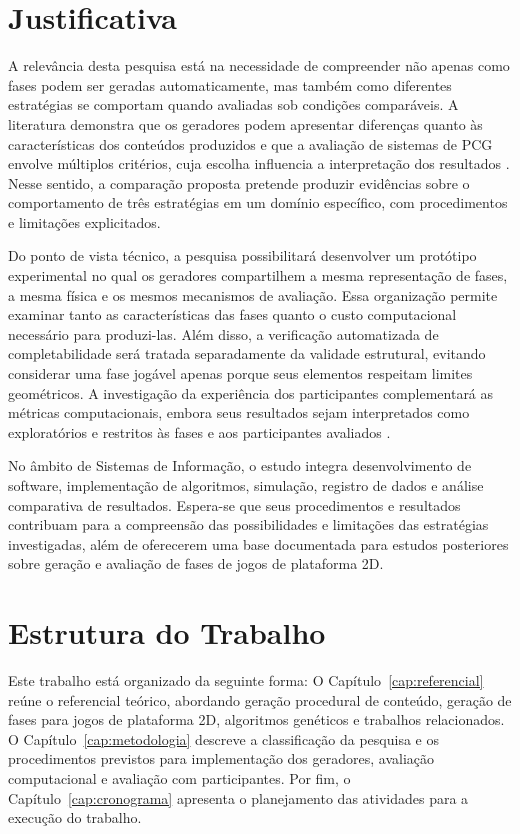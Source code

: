 \section{Justificativa}

A relevância desta pesquisa está na necessidade de compreender não apenas como 
fases podem ser geradas automaticamente, mas também como diferentes estratégias 
se comportam quando avaliadas sob condições comparáveis. A literatura demonstra 
que os geradores podem apresentar diferenças quanto às características dos 
conteúdos produzidos e que a avaliação de sistemas de PCG envolve múltiplos 
critérios, cuja escolha influencia a interpretação dos resultados 
\cite{SchaaBarriga2024,Withington2024,Khalifa2025}. Nesse sentido, a comparação 
proposta pretende produzir evidências sobre o comportamento de três estratégias 
em um domínio específico, com procedimentos e limitações explicitados.

Do ponto de vista técnico, a pesquisa possibilitará desenvolver um protótipo 
experimental no qual os geradores compartilhem a mesma representação de fases, 
a mesma física e os mesmos mecanismos de avaliação. Essa organização permite 
examinar tanto as características das fases quanto o custo computacional 
necessário para produzi-las. Além disso, a verificação automatizada de 
completabilidade será tratada separadamente da validade estrutural, evitando 
considerar uma fase jogável apenas porque seus elementos respeitam limites 
geométricos. A investigação da experiência dos participantes complementará as 
métricas computacionais, embora seus resultados sejam interpretados como 
exploratórios e restritos às fases e aos participantes avaliados 
\cite{Summerville2017,Withington2024}.

No âmbito de Sistemas de Informação, o estudo integra desenvolvimento de 
software, implementação de algoritmos, simulação, registro de dados e análise 
comparativa de resultados. Espera-se que seus procedimentos e resultados 
contribuam para a compreensão das possibilidades e limitações das estratégias 
investigadas, além de oferecerem uma base documentada para estudos posteriores 
sobre geração e avaliação de fases de jogos de plataforma 2D.

\section{Estrutura do Trabalho}

Este trabalho está organizado da seguinte forma:
O Capítulo~\ref{cap:referencial} reúne o referencial teórico, abordando 
geração procedural de conteúdo, geração de fases para jogos de plataforma 2D, 
algoritmos genéticos e trabalhos relacionados. O Capítulo~\ref{cap:metodologia} 
descreve a classificação da pesquisa e os procedimentos previstos para 
implementação dos geradores, avaliação computacional e avaliação com 
participantes. Por fim, o Capítulo~\ref{cap:cronograma} apresenta o 
planejamento das atividades para a execução do trabalho.